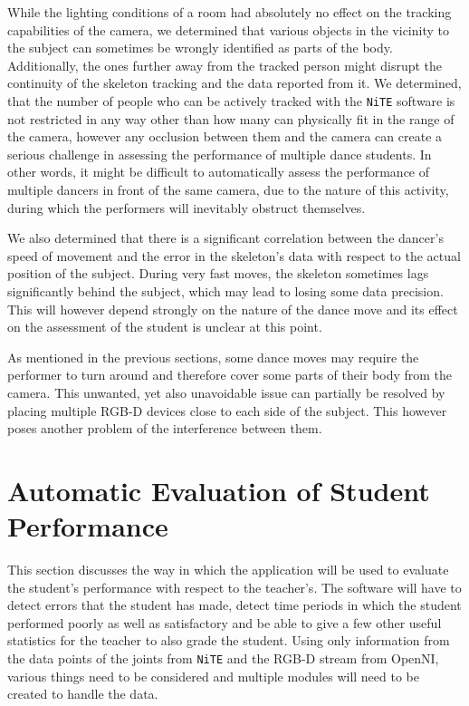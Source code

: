 \documentclass[11pt,a4paper]{article}
\begin{document}
\medskip \noindent While the lighting conditions of a room had absolutely no effect on the tracking capabilities of the camera, we determined that various objects in the vicinity to the subject can sometimes be wrongly identified as parts of the body. Additionally, the ones further away from the tracked person might disrupt the continuity of the skeleton tracking and the data reported from it. We determined, that the number of people who can be actively tracked with the \texttt{NiTE} software is not restricted in any way other than how many can physically fit in the range of the camera, however any occlusion between them and the camera can create a serious challenge in assessing the performance of multiple dance students. In other words, it might be difficult to automatically assess the performance of multiple dancers in front of the same camera, due to the nature of this activity, during which the performers will inevitably obstruct themselves.

\medskip \noindent We also determined that there is a significant correlation between the dancer's speed of movement and the error in the skeleton's data with respect to the actual position of the subject. During very fast moves, the skeleton sometimes lags significantly behind the subject, which may lead to losing some data precision. This will however depend strongly on the nature of the dance move and its effect on the assessment of the student is unclear at this point.

\medskip \noindent As mentioned in the previous sections, some dance moves may require the performer to turn around and therefore cover some parts of their body from the camera. This unwanted, yet also unavoidable issue can partially be resolved by placing multiple RGB-D devices close to each side of the subject. This however poses another problem of the interference between them. %

\clearpage

\section{Automatic Evaluation of Student Performance}
\noindent
This section discusses the way in which the application will be used to evaluate the student's performance with respect to the teacher's. The software will have to detect errors that the student has made, detect time periods in which the student performed poorly as well as satisfactory and be able to give a few other useful statistics for the teacher to also grade the student. Using only information from the data points of the joints from \texttt{NiTE} and the RGB-D stream from OpenNI, various things need to be considered and multiple modules will need to be created to handle the data. 
\end{document}
